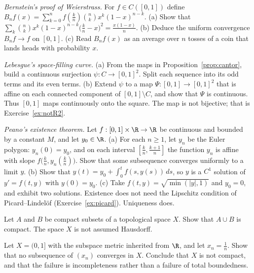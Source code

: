 \begin{exercise}[$\star\star$]\label{ex:bernstein}
\emph{Bernstein's proof of Weierstrass.} For $f\in C([0,1])$ define $B_nf(x)=\sum_{k=0}^n f(\frac kn)\binom nkx^k(1-x)^{n-k}$. (a) Show that $\sum_k\binom nkx^k(1-x)^{n-k}\bigl(\frac kn-x\bigr)^2=\frac{x(1-x)}n$. (b) Deduce the uniform convergence $B_nf\to f$ on $[0,1]$. (c) Read $B_nf(x)$ as an average over $n$ tosses of a coin that lands heads with probability $x$.
\end{exercise}

\begin{exercise}[$\star\star$]\label{ex:lebesguecurve}
\emph{Lebesgue's space-filling curve.} (a) From the maps in Proposition~\ref{prop:cantor}, build a continuous surjection $\psi:C\to[0,1]^2$. Split each sequence into its odd terms and its even terms. (b) Extend $\psi$ to a map $\Psi:[0,1]\to[0,1]^2$ that is affine on each connected component of $[0,1]\setminus C$, and show that $\Psi$ is continuous. Thus $[0,1]$ maps continuously onto the square. The map is not bijective; that is Exercise~\ref{ex:notR2}.
\end{exercise}

\begin{exercise}[$\star\star\star$]\label{ex:peano}
\emph{Peano's existence theorem.} Let $f:[0,1]\times\R\to\R$ be continuous and bounded by a constant $M$, and let $y_0\in\R$. (a) For each $n\ge1$, let $y_n$ be the Euler polygon: $y_n(0)=y_0$, and on each interval $[\frac kn,\frac{k+1}n]$ the function $y_n$ is affine with slope $f\bigl(\frac kn,y_n(\frac kn)\bigr)$. Show that some subsequence converges uniformly to a limit $y$. (b) Show that $y(t)=y_0+\int_0^t f(s,y(s))\,ds$, so $y$ is a $C^1$ solution of $y'=f(t,y)$ with $y(0)=y_0$. (c) Take $f(t,y)=\sqrt{\min(|y|,1)}$ and $y_0=0$, and exhibit two solutions. Existence does not need the Lipschitz condition of Picard--Lindel\"of (Exercise~\ref{ex:picard}). Uniqueness does.
\end{exercise}

\begin{exercise}[$\star$]\label{ex:v7c04a}
Let $A$ and $B$ be compact subsets of a topological space $X$. Show that $A\cup B$ is compact. The space $X$ is not assumed Hausdorff.
\end{exercise}

\begin{exercise}[$\star\star$]\label{ex:v7c04b}
Let $X=(0,1]$ with the subspace metric inherited from $\R$, and let $x_n=\frac1n$. Show that no subsequence of $(x_n)$ converges in $X$. Conclude that $X$ is not compact, and that the failure is incompleteness rather than a failure of total boundedness.
\end{exercise}


